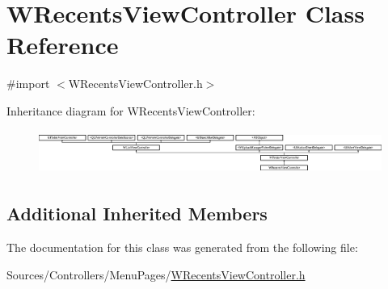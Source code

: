 \hypertarget{interface_w_recents_view_controller}{\section{W\-Recents\-View\-Controller Class Reference}
\label{interface_w_recents_view_controller}
}


{\ttfamily \#import $<$W\-Recents\-View\-Controller.\-h$>$}

Inheritance diagram for W\-Recents\-View\-Controller\-:\begin{figure}[H]
\begin{center}
\leavevmode
\includegraphics[height=1.447964cm]{interface_w_recents_view_controller}
\end{center}
\end{figure}
\subsection*{Additional Inherited Members}


The documentation for this class was generated from the following file\-:\begin{DoxyCompactItemize}
\item 
Sources/\-Controllers/\-Menu\-Pages/\hyperlink{_w_recents_view_controller_8h}{W\-Recents\-View\-Controller.\-h}\end{DoxyCompactItemize}

